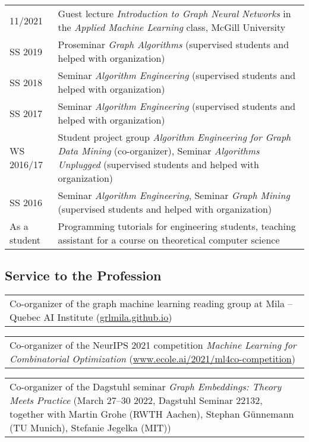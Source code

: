 \documentclass[11pt, a4paper, DIV=12]{scrartcl}
\begin{document}
\begin{tabular}{p{2.1cm}p{12.0cm}}
11/2021 & Guest lecture \emph{Introduction to Graph Neural Networks} in the \emph{Applied Machine Learning} class, McGill University\\	
	
SS 2019&Proseminar \emph{Graph Algorithms} (supervised students and helped with organization)\\
SS 2018&Seminar \emph{Algorithm Engineering} (supervised students and helped with organization)\\
SS 2017&Seminar \emph{Algorithm Engineering} (supervised students and helped with organization)\\
WS 2016/17&Student project group \emph{Algorithm Engineering for Graph Data Mining} (co-organizer), Seminar \emph{Algorithms Unplugged} (supervised students and helped with organization)\\
SS 2016& Seminar \emph{Algorithm Engineering}, Seminar \emph{Graph Mining} (supervised students and helped with organization)\\
As a student&Programming tutorials for engineering students, teaching assistant for a course on theoretical computer science\\
\end{tabular}

\subsection*{Service to the Profession}

\begin{tabular}{p{14.5cm}}
	Co-organizer of the graph machine learning reading group at Mila -- Quebec AI Institute (\url{grlmila.github.io}) \\[0.5em]	
\end{tabular}

\begin{tabular}{p{14.5cm}}
Co-organizer of the NeurIPS 2021 competition \emph{Machine Learning for Combinatorial Optimization} (\url{www.ecole.ai/2021/ml4co-competition}) \\[0.5em]	
\end{tabular}

\begin{tabular}{p{14.5cm}}
Co-organizer of the Dagstuhl seminar \emph{Graph Embeddings: Theory Meets Practice} (March 27–30 2022, Dagstuhl Seminar 22132, together with Martin Grohe (RWTH Aachen), Stephan Günnemann (TU Munich), Stefanie Jegelka (MIT)) \\[0.5em]
\end{tabular}
\end{document}

